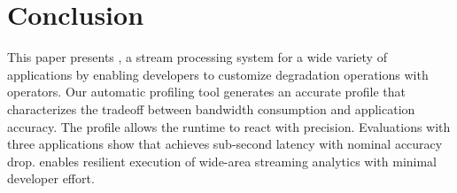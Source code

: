 \section{Conclusion}
\label{sec:conclusion}


This paper presents \sysname{}, a stream processing system for a wide variety of
applications by enabling developers to customize degradation operations with
\maybe{} operators. Our automatic profiling tool generates an accurate profile
that characterizes the tradeoff between bandwidth consumption and application
accuracy. The profile allows the runtime to react with precision. Evaluations
with three applications show that \sysname{} achieves sub-second latency with
nominal accuracy drop. \sysname{} enables resilient execution of wide-area
streaming analytics with minimal developer effort.

